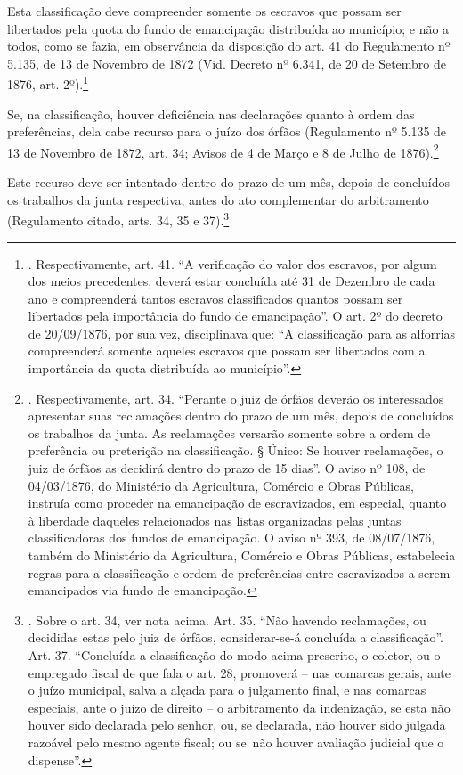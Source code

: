 Esta classificação deve compreender somente os escravos que possam ser
libertados pela quota do fundo de emancipação distribuída ao município;
e não a todos, como se fazia, em observância da disposição do art. 41 do
Regulamento nº 5.135, de 13 de Novembro de 1872 (Vid. Decreto nº 6.341,
de 20 de Setembro de 1876, art. 2º).\footnote{. Respectivamente, art.
  41. ``A verificação do valor dos escravos, por algum dos meios
  precedentes, deverá estar concluída até 31 de Dezembro de cada ano e
  compreenderá tantos escravos classificados quantos possam ser
  libertados pela importância do fundo de emancipação''. O art. 2º do
  decreto de 20/09/1876, por sua vez, disciplinava que: ``A
  classificação para as alforrias compreenderá somente aqueles escravos
  que possam ser libertados com a importância da quota distribuída ao
  município''.}

Se, na classificação, houver deficiência nas declarações quanto à ordem
das preferências, dela cabe recurso para o juízo dos órfãos (Regulamento
nº 5.135 de 13 de Novembro de 1872, art. 34; Avisos de 4 de Março e 8 de
Julho de 1876).\footnote{. Respectivamente, art. 34. ``Perante o juiz de
  órfãos deverão os interessados apresentar suas reclamações dentro do
  prazo de um mês, depois de concluídos os trabalhos da junta. As
  reclamações versarão somente sobre a ordem de preferência ou
  preterição na classificação. § Único: Se houver reclamações, o juiz de
  órfãos as decidirá dentro do prazo de 15 dias''. O aviso nº 108, de
  04/03/1876, do Ministério da Agricultura, Comércio e Obras Públicas,
  instruía como proceder na emancipação de escravizados, em especial,
  quanto à liberdade daqueles relacionados nas listas organizadas pelas
  juntas classificadoras dos fundos de emancipação. O aviso nº 393, de
  08/07/1876, também do Ministério da Agricultura, Comércio e Obras
  Públicas, estabelecia regras para a classificação e ordem de
  preferências entre escravizados a serem emancipados via fundo de
  emancipação.}

Este recurso deve ser intentado dentro do prazo de um mês, depois de
concluídos os trabalhos da junta respectiva, antes do ato complementar
do arbitramento (Regulamento citado, arts. 34, 35 e 37).\footnote{.
  Sobre o art. 34, ver nota acima. Art. 35. ``Não havendo reclamações,
  ou decididas estas pelo juiz de órfãos, considerar-se-á concluída a
  classificação''. Art. 37. ``Concluída a classificação do modo acima
  prescrito, o coletor, ou o empregado fiscal de que fala o art. 28,
  promoverá -- nas comarcas gerais, ante o juízo municipal, salva a
  alçada para o julgamento final, e nas comarcas especiais, ante o juízo
  de direito -- o arbitramento da indenização, se esta não houver sido
  declarada pelo senhor, ou, se declarada, não houver sido julgada
  razoável pelo mesmo agente fiscal; ou se~não houver avaliação judicial
  que o dispense''.}

